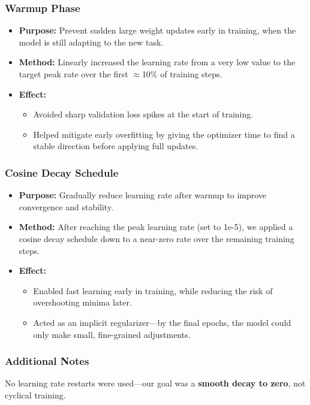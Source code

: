\subsubsection*{Warmup Phase}
\begin{itemize}[leftmargin=1.5em]
    \item \textbf{Purpose:} Prevent sudden large weight updates early in training, when the model is still adapting to the new task.
    \item \textbf{Method:} Linearly increased the learning rate from a very low value to the target peak rate over the first $\approx$10\% of training steps.
    \item \textbf{Effect:}
    \begin{itemize}
        \item Avoided sharp validation loss spikes at the start of training.
        \item Helped mitigate early overfitting by giving the optimizer time to find a stable direction before applying full updates.
    \end{itemize}
\end{itemize}

\subsubsection*{Cosine Decay Schedule}
\begin{itemize}[leftmargin=1.5em]
    \item \textbf{Purpose:} Gradually reduce learning rate after warmup to improve convergence and stability.
    \item \textbf{Method:} After reaching the peak learning rate (set to 1e-5), we applied a cosine decay schedule down to a near-zero rate over the remaining training steps.
    \item \textbf{Effect:}
    \begin{itemize}
        \item Enabled fast learning early in training, while reducing the risk of overshooting minima later.
        \item Acted as an implicit regularizer—by the final epochs, the model could only make small, fine-grained adjustments.
    \end{itemize}
\end{itemize}

\subsubsection*{Additional Notes}
No learning rate restarts were used—our goal was a \textbf{smooth decay to zero}, not cyclical training.


